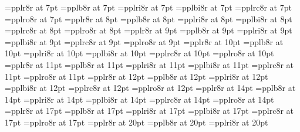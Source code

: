 %
%
%    
%    
%
%
%
%
%
\immediate{}
%
\font\sevenrm=pplr8r at 7pt
\font\sevenbf=pplb8r at 7pt
\font\sevenit=pplri8r at 7pt
\font\sevenbi=pplbi8r at 7pt
\font\sevensc=pplrc8r at 7pt
\font\sevensl=pplro8r at 7pt
%
\font\eightrm=pplr8r at 8pt
\font\eightbf=pplb8r at 8pt
\font\eightit=pplri8r at 8pt
\font\eightbi=pplbi8r at 8pt
\font\eightsc=pplrc8r at 8pt
\font\eightsl=pplro8r at 8pt
%
\font\ninerm=pplr8r at 9pt
\font\ninebf=pplb8r at 9pt
\font\nineit=pplri8r at 9pt
\font\ninebi=pplbi8r at 9pt
\font\ninesc=pplrc8r at 9pt
\font\ninesl=pplro8r at 9pt
%
\font\tenrm=pplr8r at 10pt
\font\tenbf=pplb8r at 10pt
\font\tenit=pplri8r at 10pt
\font\tenbi=pplbi8r at 10pt
\font\tensc=pplrc8r at 10pt
\font\tensl=pplro8r at 10pt
%
\font\elevenrm=pplr8r at 11pt
\font\elevenbf=pplb8r at 11pt
\font\elevenit=pplri8r at 11pt
\font\elevenbi=pplbi8r at 11pt
\font\elevensc=pplrc8r at 11pt
\font\elevensl=pplro8r at 11pt
%
\font\twelverm=pplr8r at 12pt
\font\twelvebf=pplb8r at 12pt
\font\twelveit=pplri8r at 12pt
\font\twelvebi=pplbi8r at 12pt
\font\twelvesc=pplrc8r at 12pt
\font\twelvesl=pplro8r at 12pt
%
\font\frtrm=pplr8r at 14pt
\font\frtbf=pplb8r at 14pt
\font\frtit=pplri8r at 14pt
\font\frtbi=pplbi8r at 14pt
\font\frtsc=pplrc8r at 14pt
\font\frtsl=pplro8r at 14pt
%
\font\svtrm=pplr8r at 17pt
\font\svtbf=pplb8r at 17pt
\font\svtit=pplri8r at 17pt
\font\svtbi=pplbi8r at 17pt
\font\svtsc=pplrc8r at 17pt
\font\svtsl=pplro8r at 17pt
%
\font\twtyrm=pplr8r at 20pt
\font\twtybf=pplb8r at 20pt
\font\twtyit=pplri8r at 20pt
